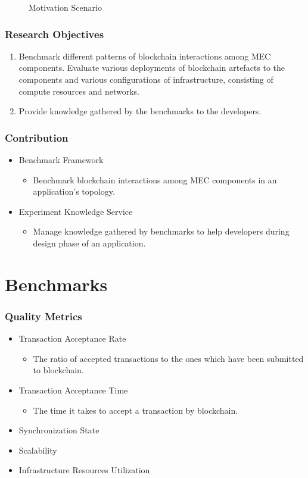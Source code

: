 \documentclass{beamer}
\begin{document}
\begin{frame}
{\begin{figure}
				\vspace{-0.5cm}
				\caption{Motivation Scenario}
			\end{figure}
		}
		
	\end{frame}
	
	
	\begin{frame}
		\frametitle{Research Objectives}
		\begin{enumerate}
			\item Benchmark different patterns of blockchain interactions among \gls{MEC} components. Evaluate various deployments of blockchain artefacts to the components and various configurations of infrastructure, consisting of compute resources and networks.
			\item Provide knowledge gathered by the benchmarks to the developers.
		\end{enumerate}
	\end{frame}


	\begin{frame}
		\frametitle{Contribution}
		\begin{itemize}
			\item Benchmark Framework
			\begin{itemize}
				\item Benchmark blockchain interactions among \gls{MEC} components in an application's topology.
			\end{itemize}
			\item Experiment Knowledge Service
			\begin{itemize}
				\item Manage knowledge gathered by benchmarks to help developers during design phase of an application.
			\end{itemize}
		\end{itemize}
	\end{frame}
	
	\section{Benchmarks}
	
	\begin{frame}
		\frametitle{Quality Metrics}
		\begin{itemize}
			\item Transaction Acceptance Rate
			\begin{itemize}
				\item The ratio of accepted transactions to the ones which have been submitted to blockchain.
			\end{itemize}
			\item Transaction Acceptance Time
			\begin{itemize}
				\item The time it takes to accept a transaction by blockchain.
			\end{itemize}
			\item Synchronization State
			\item Scalability
			\item Infrastructure Resources Utilization
		\end{itemize}
	\end{frame}
		
\end{document}
